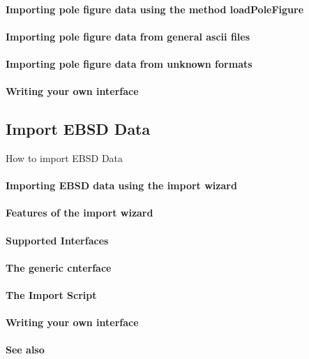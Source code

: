 \documentclass{article}
\begin{document}
			\paragraph{Importing pole figure data using the method loadPoleFigure}
		
			\paragraph{Importing pole figure data from general ascii files}
		
			\paragraph{Importing pole figure data from unknown formats}
		
			\paragraph{Writing your own interface}
		
		\subsection{Import EBSD Data}

		
                     \begin{par}
How to import EBSD Data
\end{par} \vspace{1em}

                  
			\paragraph{Importing EBSD data using the import wizard}
		
			\paragraph{Features of the import wizard}
		
			\paragraph{Supported Interfaces}
		
			\paragraph{The generic cnterface}
		
			\paragraph{The Import Script}
		
			\paragraph{Writing your own interface}
		
			\paragraph{See also}
		

 
\end{document}

